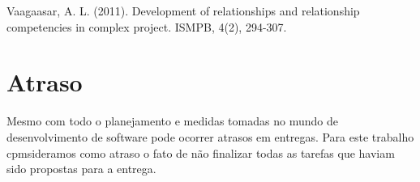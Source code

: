     Vaagaasar, A. L. (2011). Development of relationships and relationship competencies in complex project. ISMPB, 4(2), 294-307.


  \section{Atraso}

    Mesmo com todo o planejamento e medidas tomadas no mundo de desenvolvimento de software pode ocorrer atrasos em entregas. Para este trabalho cpmsideramos como atraso o fato de não finalizar todas as tarefas que haviam sido propostas para a entrega.





